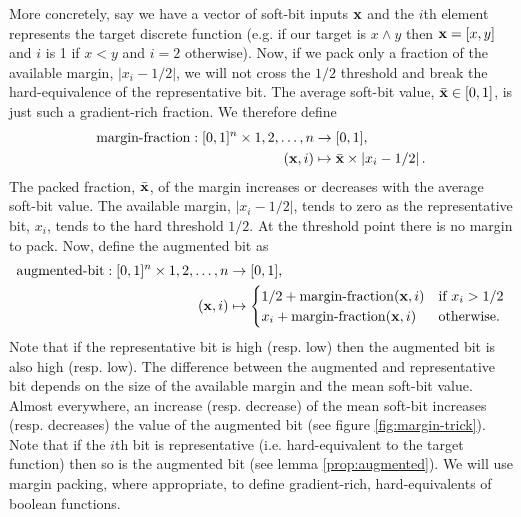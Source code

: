\documentclass{article} %
\begin{document}
More concretely, say we have a vector of soft-bit inputs ${\bf x}$ and the $i$th element represents the target discrete function (e.g. if our target is $x \wedge y$ then ${\bf x}=[x,y]$ and $i$ is 1 if $x<y$ and $i=2$ otherwise). Now, if we pack only a fraction of the available margin, $|x_{i}-1/2|$, we will not cross the $1/2$ threshold and break the hard-equivalence of the representative bit. The average soft-bit value, $\bar{\bf x} \in [0,1]$, is just such a gradient-rich fraction. We therefore define 
\begin{equation*}
\begin{aligned}
\operatorname{margin-fraction}: [0,1]^{n} \times 1,2,\dots,n &\to [0,1],\\
({\bf x}, i) &\mapsto \bar{\bf x} \times \left|x_{i} - 1/2\right| \text{.}
\end{aligned}
\end{equation*}
The packed fraction, $\bar{\bf x}$, of the margin increases or decreases with the average soft-bit value. The available margin, $\left|x_{i} - 1/2\right|$, tends to zero as the representative bit, $x_{i}$, tends to the hard threshold $1/2$. At the threshold point there is no margin to pack. Now, define the augmented bit as
\begin{equation}
\begin{aligned}
\operatorname{augmented-bit}: [0,1]^{n} \times 1,2,\dots,n &\to [0,1],\\
({\bf x}, i) &\mapsto 
\begin{cases}
1/2 + \operatorname{margin-fraction}({\bf x}, i) & \text{if } x_{i} > 1/2 \\
x_{i} + \operatorname{margin-fraction}({\bf x}, i) & \text{otherwise.}
\end{cases}
\end{aligned}
\label{eq:augmented-bit}
\end{equation}
Note that if the representative bit is high (resp. low) then the augmented bit is also high (resp. low). The difference between the augmented and representative bit depends on the size of the available margin and the mean soft-bit value. Almost everywhere, an increase (resp. decrease) of the mean soft-bit increases (resp. decreases) the value of the augmented bit (see figure \ref{fig:margin-trick}). Note that if the $i$th bit is representative (i.e. hard-equivalent to the target function) then so is the augmented bit (see lemma \ref{prop:augmented}). We will use margin packing, where appropriate, to define gradient-rich, hard-equivalents of boolean functions.
\end{document}
